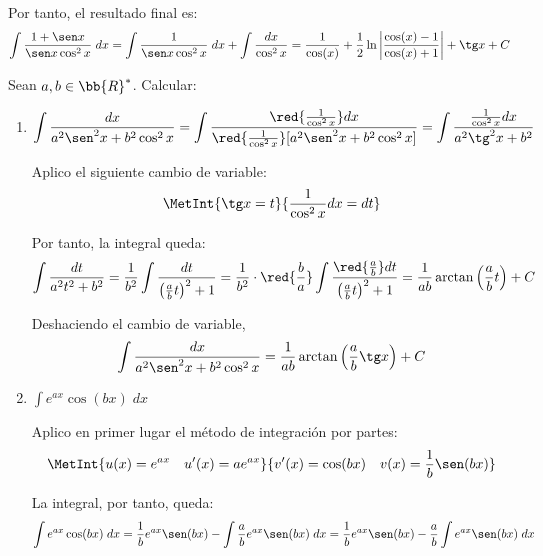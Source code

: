 \begin{ejercicio}
\begin{enumerate}
   Por tanto, el resultado final es:
   \begin{equation*}
       \int \frac{1+\sen x}{\sen x \cos^2 x}\;dx
       = \int \frac{1}{\sen x \cos^2 x}\;dx+\int \frac{dx}{\cos^2 x}
       = \frac{1}{\cos (x)}+\frac{1}{2}\ln \left|\frac{\cos (x)-1}{\cos (x)+1}\right| +\tg x +C
   \end{equation*}
   
\end{enumerate}


\end{ejercicio}

\begin{ejercicio} Sean $a,b\in \bb{R}^\ast$. Calcular:
    \begin{enumerate}
        \item $\displaystyle
            \int \frac{dx}{a^2\sen^2 x + b^2 \cos ^2 x}
            = \int \frac{\red{\frac{1}{\cos^2 x}}dx}{\red{\frac{1}{\cos^2 x}}[a^2\sen^2 x + b^2 \cos ^2 x]}
            = \int \frac{{\frac{1}{\cos^2 x}}dx}{a^2\tg^2 x + b^2}$

        Aplico el siguiente cambio de variable:
        \begin{equation*}
            \MetInt{\tg x =t}{\frac{1}{\cos^2 x}dx = dt}
        \end{equation*}

        Por tanto, la integral queda:
        \begin{equation*}
            \int \frac{dt}{a^2t^2+b^2} = \frac{1}{b^2} \int \frac{dt}{\left(\frac{a}{b}t\right)^2+1}
            = \frac{1}{b^2}\cdot\red{\frac{b}{a}} \int \frac{\red{\frac{a}{b}}dt}{\left(\frac{a}{b}t\right)^2+1} = \frac{1}{ab} \arctan \left(\frac{a}{b}t\right)+C
        \end{equation*}

        Deshaciendo el cambio de variable,
        \begin{equation*}
            \int \frac{dx}{a^2\sen^2 x + b^2 \cos ^2 x}
            = \frac{1}{ab} \arctan \left(\frac{a}{b}\tg x\right)+C
        \end{equation*}

        \item $\displaystyle \int e^{ax}\cos(bx)\;dx$

        Aplico en primer lugar el método de integración por partes:
        $$\MetInt{u(x)=e^{ax}\quad u'(x)=ae^{ax}}{v'(x)=\cos (bx)\quad v(x)=\frac{1}{b}\sen(bx)}$$

        La integral, por tanto, queda:
        \begin{equation*}
            \int e^{ax}\cos(bx)\;dx = \frac{1}{b}e^{ax}\sen(bx)-\int \frac{a}{b}e^{ax}\sen (bx)\;dx
            = \frac{1}{b}e^{ax}\sen(bx)-\frac{a}{b}\int e^{ax}\sen (bx)\;dx
        \end{equation*}


\end{enumerate}
\end{ejercicio}
